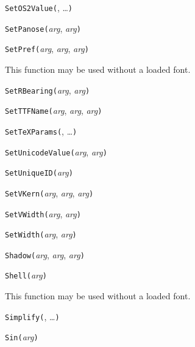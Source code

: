 
\noindent\texttt{SetOS2Value(}, \ldots\texttt{)}


\noindent\texttt{SetPanose(}\textit{arg}, \textit{arg}\texttt{)}


\noindent\texttt{SetPref(}\textit{arg}, \textit{arg}, \textit{arg}\texttt{)}

This function may be used without a loaded font.


\noindent\texttt{SetRBearing(}\textit{arg}, \textit{arg}\texttt{)}


\noindent\texttt{SetTTFName(}\textit{arg}, \textit{arg}, \textit{arg}\texttt{)}


\noindent\texttt{SetTeXParams(}, \ldots\texttt{)}


\noindent\texttt{SetUnicodeValue(}\textit{arg}, \textit{arg}\texttt{)}


\noindent\texttt{SetUniqueID(}\textit{arg}\texttt{)}


\noindent\texttt{SetVKern(}\textit{arg}, \textit{arg}, \textit{arg}\texttt{)}


\noindent\texttt{SetVWidth(}\textit{arg}, \textit{arg}\texttt{)}


\noindent\texttt{SetWidth(}\textit{arg}, \textit{arg}\texttt{)}


\noindent\texttt{Shadow(}\textit{arg}, \textit{arg}, \textit{arg}\texttt{)}


\noindent\texttt{Shell(}\textit{arg}\texttt{)}

This function may be used without a loaded font.


\noindent\texttt{Simplify(}, \ldots\texttt{)}


\noindent\texttt{Sin(}\textit{arg}\texttt{)}

